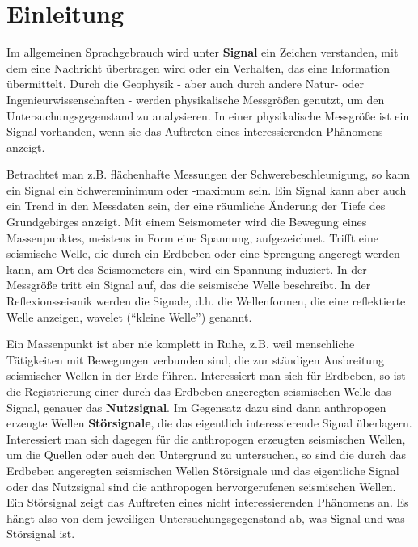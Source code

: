 
\chapter{Einleitung}



Im allgemeinen Sprachgebrauch wird unter {\bf Signal} ein Zeichen verstanden, mit dem eine Nachricht übertragen wird oder ein Verhalten, das eine Information übermittelt. Durch die Geophysik - aber auch durch andere Natur- oder Ingenieurwissenschaften - werden physikalische Messgrößen genutzt, um den Untersuchungsgegenstand zu analysieren. In einer physikalische Messgröße ist ein Signal vorhanden, wenn sie das Auftreten eines interessierenden Phänomens anzeigt. 

Betrachtet man z.B. flächenhafte Messungen der Schwerebeschleunigung, so kann ein Signal ein Schwereminimum oder -maximum sein. Ein Signal kann aber auch ein Trend in den Messdaten sein, der eine räumliche Änderung der Tiefe des Grundgebirges anzeigt. Mit einem Seismometer wird die  Bewegung eines Massenpunktes, meistens in Form eine Spannung, aufgezeichnet. Trifft eine seismische Welle, die durch ein Erdbeben oder eine Sprengung angeregt werden kann, am Ort des Seismometers ein, wird ein Spannung induziert. In der Messgröße tritt ein Signal auf, das die seismische Welle beschreibt. In der Reflexionsseismik werden die Signale, d.h. die Wellenformen, die eine reflektierte Welle anzeigen, wavelet (``kleine Welle'') genannt. 

Ein Massenpunkt ist aber nie komplett in Ruhe, z.B. weil menschliche Tätigkeiten mit Bewegungen verbunden sind, die zur ständigen Ausbreitung seismischer Wellen in der Erde führen. Interessiert man sich für Erdbeben, so ist die Registrierung einer durch das Erdbeben angeregten seismischen Welle das Signal, genauer das {\bf Nutzsignal}. Im Gegensatz dazu sind dann anthropogen erzeugte Wellen {\bf Störsignale}, die das eigentlich interessierende Signal überlagern. Interessiert man sich dagegen für die anthropogen erzeugten seismischen Wellen, um die Quellen oder auch den Untergrund zu untersuchen, so sind die durch das Erdbeben angeregten seismischen Wellen Störsignale und das eigentliche Signal oder das Nutzsignal sind die anthropogen hervorgerufenen seismischen Wellen. Ein Störsignal zeigt das Auftreten eines nicht interessierenden Phänomens an. Es hängt also von dem jeweiligen Untersuchungsgegenstand ab, was Signal und was Störsignal ist.

